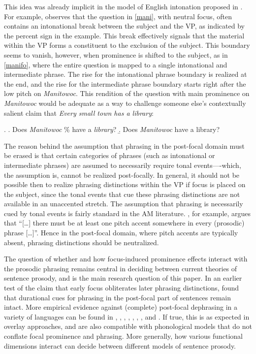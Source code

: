 \documentclass[preprint,review,12pt,authoryear,times]{elsarticle}
\begin{document}
This idea was already implicit in the model of English intonation proposed in \citet{pierr80}. For example, \citet[265]{pierr80} observes that the question in \ref{mani}, with neutral focus, often contains an intonational break between the subject and the VP, as indicated by the percent sign in the example. This break effectively signals that the material within the VP forms a constituent to the exclusion of the subject. This boundary seems to vanish, however, when prominence is shifted to the subject, as in \ref{manifo}, where the entire question is mapped to a single intonational and intermediate phrase. The rise for the intonational phrase boundary is realized at the end, and the rise for the intermediate phrase boundary starts right after the low pitch on {\em Manitowoc}. This rendition of the question with main prominence on {\em Manitowoc} would be adequate as a way to challenge someone else's contextually salient claim that {\em Every small town has a library}: 

\ex. 
\a. Does {\em Manitowoc} \% have a {\em library}?\label{mani}
\b. Does {\em Manitowoc}  have a library?\label{manifo}

The reason behind the assumption that phrasing in the post-focal domain must be erased is that certain categories of phrases (such as intonational or intermediate phrases) are assumed to necessarily require tonal events----which, the assumption is, cannot be realized post-focally. In general, it should not be possible then to realize phrasing distinctions within the VP if focus is placed on the subject, since the tonal events that cue these phrasing distinctions are not available in an unaccented stretch. The assumption that phrasing is necessarily cued by tonal events is fairly standard in the AM literature. \citet{beckm96}, for example,  argues that ``[\ldots] there must be at least one pitch accent somewhere in every (prosodic) phrase [\ldots]''. Hence in the post-focal domain, where pitch accents are typically absent, phrasing distinctions should be neutralized. 

The question of whether and how focus-induced prominence effects interact with the prosodic phrasing remains central in deciding between current theories of sentence prosody, and is the main research question of this paper. In an earlier test of the claim that early focus obliterates later phrasing distinctions,  \citet{norcl05} found that durational cues for phrasing in the post-focal part of sentences remain intact.  More empirical evidence against (complete) post-focal dephrasing in a variety of languages can be found in \citet{hayes91}, \citet{jun00}, \citet{sugah03}, \citet{ishih03}, \citet{ishih07}, \citet{fery10}, \citet{jun11}, \citet{ishih16} and \citet{kugle17}.  If true, this is as expected in overlay approaches, and are also compatible with phonological models that do not conflate focal prominence and phrasing. More generally, how various functional dimensions interact can decide between different models of sentence prosody. 
\end{document}
